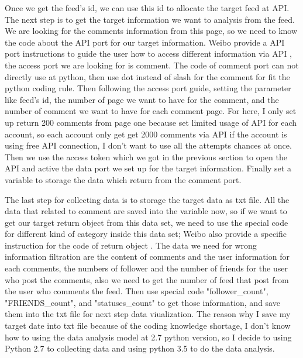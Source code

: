 \documentclass[sigconf]{acmart}
\begin{document}
Once we get the feed's id, we can use this id to allocate the target feed at API. The next step is to get the target information we want to analysis from the feed. We are looking for the comments information from this page, so we need to know the code about the API port for our target information. Weibo provide a API port instructions to guide the user how to access different information via API \cite{method:06}, the access port we are looking for is comment. The code of comment port can not directly use at python, then use dot instead of slash for the comment for fit the python coding rule. Then following the access port guide, setting the parameter like feed's id, the number of page we want to have for the comment, and the number of comment we want to have for each comment page. For here, I only set up return 200 comments from page one because set limited usage of API for each account, so each account only get get 2000 comments via API if the account is using free API connection, I don't want to use all the attempts chances at once. Then we use the access token which we got in the previous section to open the API and active the data port we set up for the target information. Finally set a variable to storage the data which return from the comment port.

The last step for collecting data is to storage the target data as txt file. All the data that related to comment are saved into the variable now, so if we want to get our target return object from this data set, we need to use the special code for different kind of category inside this data set; Weibo also provide a specific instruction for the code of return object \cite{method:07}. The data we need for wrong information filtration are the content of comments and the user information for each comments, the numbers of follower and the number of friends for the user who post the comments, also we need to get the number of feed that post from the user who comments the feed. Then use special code "follower\_count", "FRIENDS\_count", and "statuses\_count" to get those information, and save them into the txt file for next step data viualization. The reason why I save my target date into txt file because of the coding knowledge shortage, I don't know how to using the data analysis model at 2.7 python version, so I decide to using Python 2.7 to collecting data and using python  3.5 to do the data analysis.
\end{document}
